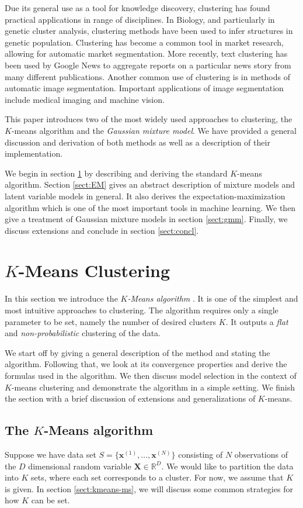 \documentclass[final,3p,times,twocolumn]{elsarticle}
\let\bs\boldsymbol
\begin{document}
Due its general use as a tool for knowledge discovery, clustering has found practical applications in range of disciplines.
In Biology, and particularly in genetic cluster analysis, clustering methods have been used to infer structures in genetic population.
Clustering has become a common tool in market research, allowing for automatic market segmentation.
More recently, text clustering has been used by Google News to aggregate reports on a particular news story from many different publications.
Another common use of clustering is in methods of automatic image segmentation. Important applications of image segmentation include medical imaging and machine vision.

This paper introduces two of the most widely used approaches to clustering, the $K$-means algorithm and the \emph{Gaussian mixture model}.
We have provided a general discussion and derivation of both methods as well as a description of their implementation.

We begin in section \ref{sect:kmeans} by describing and deriving the standard $K$-means algorithm.
Section \ref{sect:EM} gives an abstract description of mixture models and latent variable models in general.
It also derives the expectation-maximization algorithm which is one of the most important tools in machine learning.
We then give a treatment of Gaussian mixture models in section \ref{sect:gmm}.
Finally, we discuss extensions and conclude in section \ref{sect:concl}.

\section{$K$-Means Clustering}
\label{sect:kmeans}
In this section we introduce the \emph{$K$-Means algorithm} \cite{lloyd1982}.
It is one of the simplest and most intuitive approaches to clustering.
The algorithm requires only a single parameter to be set, namely the number of desired clusters $K$. 
It outputs a \emph{flat} and \emph{non-probabilistic} clustering of the data.

We start off by giving a general description of the method and stating the algorithm.
Following that, we look at its convergence properties and derive the formulas used in the algorithm.
We then discuss model selection in the context of $K$-means clustering and demonstrate the algorithm in a simple setting.
We finish the section with a brief discussion of extensions and generalizations of $K$-means.



\subsection{The $K$-Means algorithm}
Suppose we have data set $S = \{\bs x^{(1)},\dots,\bs x^{(N)}\}$ consisting of $N$ observations of the $D$ dimensional random variable $\bs X \in \mathbb{R}^D$.
We would like to partition the data into $K$ sets, where each set corresponds to a cluster.
For now, we assume that $K$ is given. In section \ref{sect:kmeans-ms}, we will discuss some common strategies for how $K$ can be set.
\end{document}
